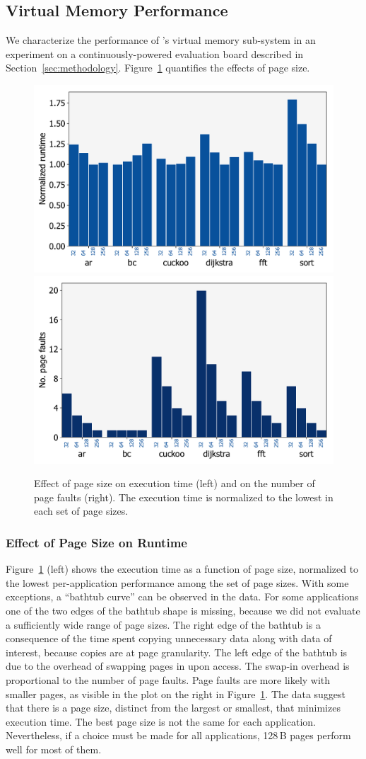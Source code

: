	

\subsection{Virtual Memory Performance}
\label{sec:results_memory_management}

We characterize the performance of \sys's virtual memory sub-system in an
experiment on a continuously-powered evaluation board described in
Section~\ref{sec:methodology}.  Figure~\ref{fig:page_size} quantifies the
effects of page size.


\begin{figure}
	\centering
	\includegraphics[width=0.49\columnwidth]{figures/page_exec-time}
	\includegraphics[width=0.49\columnwidth]{figures/pagePulls}
    \caption{Effect of page size on execution time (left) and on the number of
page faults (right). The execution time is normalized to the lowest in each set
of page sizes.}
	\label{fig:page_size}
\end{figure}


\subsubsection{Effect of Page Size on Runtime}

Figure~\ref{fig:page_size} (left) shows the execution time as a function
of page size, normalized to the lowest per-application performance among the
set of page sizes.
%
With some exceptions, a ``bathtub curve'' can be observed in the data.  For
some applications one of the two edges of the bathtub shape is missing, because
we did not evaluate a sufficiently wide range of page sizes.
%
The right edge of the bathtub is a consequence of the time spent copying
unnecessary data along with data of interest, because copies are at page
granularity.
%
The left edge of the bathtub is due to the overhead of swapping pages in
upon access.
%
The swap-in overhead is proportional to the number of page faults.
%
Page faults are more likely with smaller pages, as visible in the plot on the
right in Figure~\ref{fig:page_size}.
%
The data suggest that there is a page size, distinct from the largest or
smallest, that minimizes execution time. The best page size is not the same for
each application. Nevertheless, if a choice must be made for all applications,
128\,B pages perform well for most of them.


